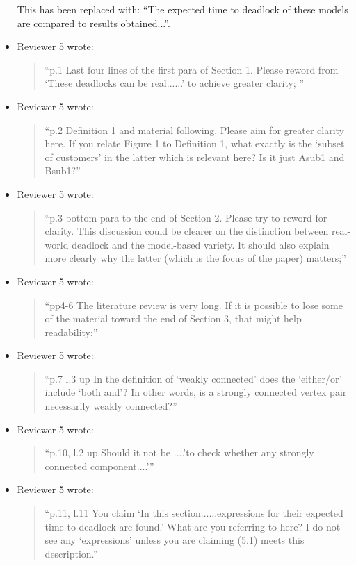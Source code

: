 \documentclass{article}
\begin{document}
\begin{itemize}
This has been replaced with: ``The expected time to deadlock of these models are compared to results obtained...''.


\item Reviewer 5 wrote:
\begin{quote}
``p.1 Last four lines of the first para of Section 1. Please reword from ‘These deadlocks can be real......’ to achieve greater clarity;
''
\end{quote}


\item Reviewer 5 wrote:
\begin{quote}
``p.2 Definition 1 and material following. Please aim for greater clarity here. If you relate Figure 1 to Definition 1, what exactly is the ‘subset of customers’ in the latter which is relevant here? Is it just Asub1 and Bsub1?''
\end{quote}


\item Reviewer 5 wrote:
\begin{quote}
``p.3 bottom para to the end of Section 2. Please try to reword for clarity. This discussion could be clearer on the distinction between real-world deadlock and the model-based variety. It should also explain more clearly why the latter (which is the focus of the paper) matters;''
\end{quote}


\item Reviewer 5 wrote:
\begin{quote}
``pp4-6 The literature review is very long. If it is possible to lose some of the material toward the end of Section 3, that might help readability;''
\end{quote}


\item Reviewer 5 wrote:
\begin{quote}
``p.7 l.3 up In the definition of ‘weakly connected’ does the ‘either/or’ include ‘both and’? In other words, is a strongly connected vertex pair necessarily weakly connected?''
\end{quote}


\item Reviewer 5 wrote:
\begin{quote}
``p.10, l.2 up Should it not be ....’to check whether any strongly connected component....’''
\end{quote}


\item Reviewer 5 wrote:
\begin{quote}
``p.11, l.11 You claim ‘In this section......expressions for their expected time to deadlock are found.’ What are you referring to here? I do not see any ‘expressions’ unless you are claiming (5.1) meets this description.''
\end{quote}



\end{itemize}
\end{document}
